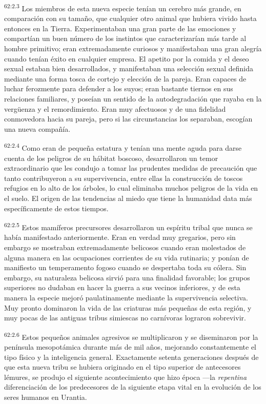 \par
\textsuperscript{62:2.3} Los miembros de esta nueva especie tenían un cerebro más grande, en comparación con su tamaño, que cualquier otro animal que hubiera vivido hasta entonces en la Tierra. Experimentaban una gran parte de las emociones y compartían un buen número de los instintos que caracterizarían más tarde al hombre primitivo; eran extremadamente curiosos y manifestaban una gran alegría cuando tenían éxito en cualquier empresa. El apetito por la comida y el deseo sexual estaban bien desarrollados, y manifestaban una selección sexual definida mediante una forma tosca de cortejo y elección de la pareja. Eran capaces de luchar ferozmente para defender a los suyos; eran bastante tiernos en sus relaciones familiares, y poseían un sentido de la autodegradación que rayaba en la verg\"uenza y el remordimiento. Eran muy afectuosos y de una fidelidad conmovedora hacia su pareja, pero si las circunstancias los separaban, escogían una nueva compañía.

\par
\textsuperscript{62:2.4} Como eran de pequeña estatura y tenían una mente aguda para darse cuenta de los peligros de su hábitat boscoso, desarrollaron un temor extraordinario que les condujo a tomar las prudentes medidas de precaución que tanto contribuyeron a su supervivencia, entre ellas la construcción de toscos refugios en lo alto de los árboles, lo cual eliminaba muchos peligros de la vida en el suelo. El origen de las tendencias al miedo que tiene la humanidad data más específicamente de estos tiempos.

\par
\textsuperscript{62:2.5} Estos mamíferos precursores desarrollaron un espíritu tribal que nunca se había manifestado anteriormente. Eran en verdad muy gregarios, pero sin embargo se mostraban extremadamente belicosos cuando eran molestados de alguna manera en las ocupaciones corrientes de su vida rutinaria; y ponían de manifiesto un temperamento fogoso cuando se despertaba toda su cólera. Sin embargo, su naturaleza belicosa sirvió para una finalidad favorable; los grupos superiores no dudaban en hacer la guerra a sus vecinos inferiores, y de esta manera la especie mejoró paulatinamente mediante la supervivencia selectiva. Muy pronto dominaron la vida de las criaturas más pequeñas de esta región, y muy pocas de las antiguas tribus simiescas no carnívoras lograron sobrevivir.

\par
\textsuperscript{62:2.6} Estos pequeños animales agresivos se multiplicaron y se diseminaron por la península mesopotámica durante más de mil años, mejorando constantemente el tipo físico y la inteligencia general. Exactamente setenta generaciones después de que esta nueva tribu se hubiera originado en el tipo superior de antecesores lémures, se produjo el siguiente acontecimiento que hizo época ---la \textit{repentina} diferenciación de los predecesores de la siguiente etapa vital en la evolución de los seres humanos en Urantia.

